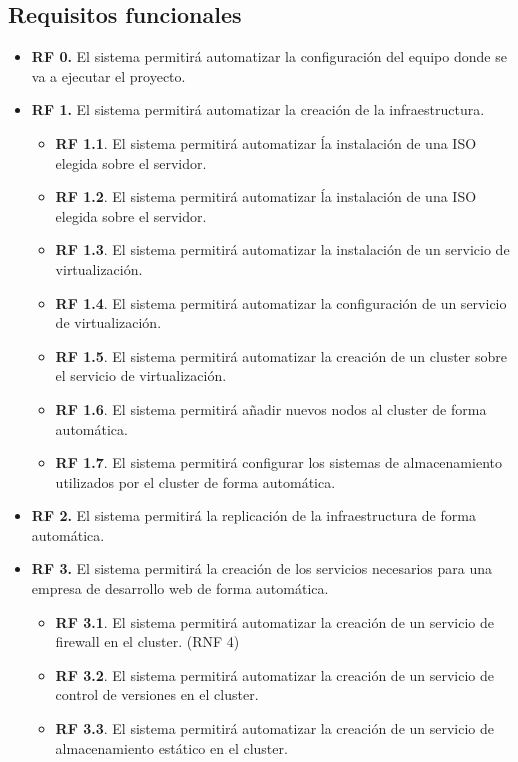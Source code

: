 	\subsection{Requisitos funcionales}
	\label{requisitosfuncionales}
	\begin{itemize}
		\item \textbf{RF 0.} El sistema permitirá automatizar la configuración del equipo donde se va a ejecutar el proyecto. \label{RF0}
		\item \textbf{RF 1.} El sistema permitirá automatizar la creación de la infraestructura. \label{RF1}
		\begin{itemize}
			\item \textbf{RF 1.1}. El sistema permitirá automatizar ĺa instalación de una ISO elegida sobre el servidor.
			\item \textbf{RF 1.2}. El sistema permitirá automatizar ĺa instalación de una ISO elegida sobre el servidor.
			\item \textbf{RF 1.3}. El sistema permitirá automatizar la instalación de un servicio de virtualización. 
			\item \textbf{RF 1.4}. El sistema permitirá automatizar la configuración de un servicio de virtualización.
			\item \textbf{RF 1.5}. El sistema permitirá automatizar la creación de un cluster sobre el servicio de virtualización.
			\item \textbf{RF 1.6}. El sistema permitirá añadir nuevos nodos al cluster de forma automática.
			\item \textbf{RF 1.7}. El sistema permitirá configurar los sistemas de almacenamiento utilizados por el cluster de forma automática.
		\end{itemize}
		\item \textbf{RF 2.} El sistema permitirá la replicación de la infraestructura de forma automática. \label{RF2}
		\item \textbf{RF 3.} El sistema permitirá la creación de los servicios necesarios para una empresa de desarrollo web de forma automática. \label{RF3}
		\begin{itemize}
			\item \textbf{RF 3.1}. El sistema permitirá automatizar la creación de un servicio de firewall en el cluster. (RNF 4)
			\item \textbf{RF 3.2}. El sistema permitirá automatizar la creación de un servicio de control de versiones en el cluster.
			\item \textbf{RF 3.3}. El sistema permitirá automatizar la creación de un servicio de almacenamiento estático en el cluster.

\end{itemize}
\end{itemize}
